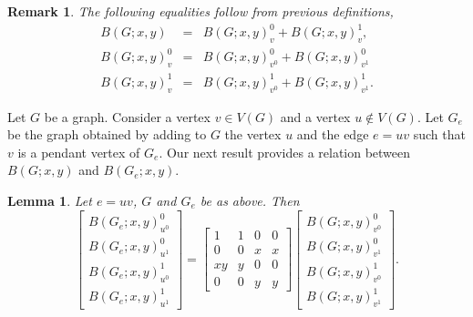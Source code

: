 \documentclass[review]{elsarticle}
\newtheorem{lemma}[theorem]{Lemma}
\newtheorem{remark}[theorem]{Remark}
\begin{document}
\begin{remark}\label{remark:frank} 
  The following equalities follow from previous definitions,
\begin{eqnarray*}
B(G;x,y)& = & B(G;x,y)^{0}_{v}+B(G;x,y)^{1}_{v},\\
B(G;x,y)^{0}_{v}& = & B(G;x,y)^{0}_{v^{0}}+B(G;x,y)^{0}_{v^{1}}\\
B(G;x,y)^{1}_{v}& = & B(G;x,y)^{1}_{v^{0}}+B(G;x,y)^{1}_{v^{1}}.
\end{eqnarray*}
\end{remark}
\medskip

Let $G$ be a graph. Consider a vertex $v\in V(G)$ and a vertex $u\notin V(G)$. Let $G_e$ be the graph obtained by adding to $G$ the vertex $u$ and the edge $e=uv$ such that $v$ is a pendant vertex of $G_e$. Our next result provides a relation between $B(G;x,y)$ and $B(G_{e};x,y)$.

\begin{lemma}\label{l:pendent+}
 Let $e=uv$, $G$ and $G_{e}$ be as above. Then
 \[
 \begin{bmatrix}
     B(G_{e};x,y)^{0}_{u^{0}} \\ B(G_{e};x,y)^{0}_{u^{1}} \\ B(G_{e};x,y)^{1}_{u^{0}} \\ B(G_{e};x,y)^{1}_{u^{1}}
 \end{bmatrix}
 =
 \begin{bmatrix}
     1 & 1 & 0 & 0 \\ 0 & 0 & x & x \\ xy & y & 0 & 0 \\ 0 & 0 & y & y
 \end{bmatrix}
 \begin{bmatrix}
     B(G;x,y)^{0}_{v^{0}} \\ B(G;x,y)^{0}_{v^{1}} \\ B(G;x,y)^{1}_{v^{0}} \\ B(G;x,y)^{1}_{v^{1}}
 \end{bmatrix}.
 \]
\end{lemma}
\end{document}
